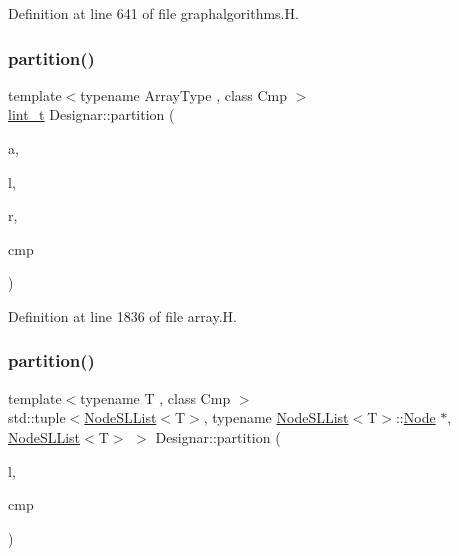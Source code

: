 Definition at line 641 of file graphalgorithms.\+H.

\mbox{\label{namespace_designar_a43b31dd9df26bd0c268d2aa653de6cf0}} 
\subsubsection{\texorpdfstring{partition()}{partition()}\hspace{0.1cm}{\footnotesize\ttfamily [1/3]}}
{\footnotesize\ttfamily template$<$typename Array\+Type , class Cmp $>$ \\
\hyperlink{namespace_designar_a9d113d66a39e82b73727c72cd3a52f73}{lint\+\_\+t} Designar\+::partition (\begin{DoxyParamCaption}\item[{Array\+Type \&}]{a,  }\item[{\hyperlink{namespace_designar_a9d113d66a39e82b73727c72cd3a52f73}{lint\+\_\+t}}]{l,  }\item[{\hyperlink{namespace_designar_a9d113d66a39e82b73727c72cd3a52f73}{lint\+\_\+t}}]{r,  }\item[{Cmp \&}]{cmp }\end{DoxyParamCaption})}



Definition at line 1836 of file array.\+H.

\mbox{\label{namespace_designar_acbe78eef938395624f248f069fcc3de0}} 
\subsubsection{\texorpdfstring{partition()}{partition()}\hspace{0.1cm}{\footnotesize\ttfamily [2/3]}}
{\footnotesize\ttfamily template$<$typename T , class Cmp $>$ \\
std\+::tuple$<$\hyperlink{class_designar_1_1_node_s_l_list}{Node\+S\+L\+List}$<$T$>$, typename \hyperlink{class_designar_1_1_node_s_l_list}{Node\+S\+L\+List}$<$T$>$\+::\hyperlink{namespace_designar_a5af326c65aa2bd26b26c410f2030d09e}{Node} $\ast$, \hyperlink{class_designar_1_1_node_s_l_list}{Node\+S\+L\+List}$<$T$>$ $>$ Designar\+::partition (\begin{DoxyParamCaption}\item[{\hyperlink{class_designar_1_1_node_s_l_list}{Node\+S\+L\+List}$<$ T $>$ \&}]{l,  }\item[{Cmp \&}]{cmp }\end{DoxyParamCaption})\hspace{0.3cm}{\ttfamily [inline]}}



